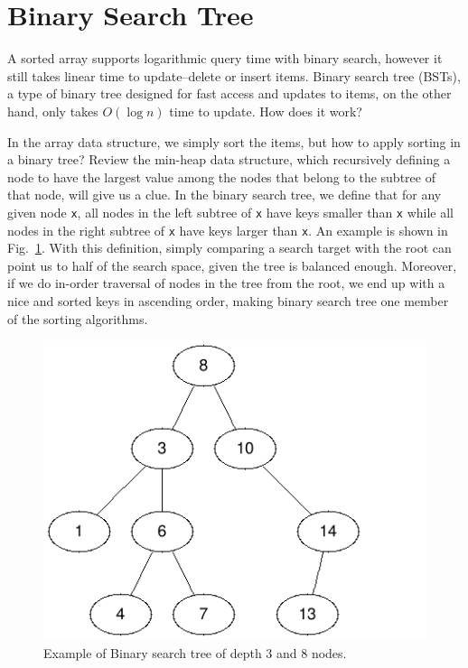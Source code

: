 \documentclass[main.tex]{subfiles}
\begin{document}


\section{Binary Search Tree}
\label{sec_binary_search_tree}

A sorted array supports logarithmic query time with binary search, however it still takes linear time to update--delete or insert items. Binary search tree (BSTs), a type of binary tree designed for fast access and updates to items,  on the other hand, only takes $O(\log n)$ time to update. How does it work?

In the array data structure, we simply sort the items, but how to apply sorting in a binary tree?  Review the min-heap data structure, which recursively defining a node to have the largest value among the nodes that belong to the subtree of that node, will give us a clue. In the binary search tree, we define that for any given node \texttt{x}, all nodes in the left subtree of \texttt{x} have keys smaller than \texttt{x} while all nodes in the right subtree of \texttt{x} have keys larger than \texttt{x}. An example is shown in Fig.~\ref{fig:bst}. With this definition, simply comparing a search target with the root can point us to half of the search space, given the tree is balanced enough. Moreover, if we do in-order traversal of nodes in the tree from the root, we end up with a nice and sorted keys in ascending order, making binary search tree one member of the sorting algorithms. 
\begin{figure}[H]
    \centering
    \includegraphics[width = 0.6\columnwidth]{fig/bst_example.png}
    \caption{Example of Binary search tree of depth 3 and 8 nodes.}
    \label{fig:bst}
\end{figure}
\end{document}
